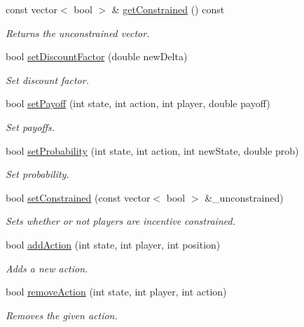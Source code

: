 \begin{DoxyCompactItemize}
const vector$<$ bool $>$ \& \hyperlink{classSGGame_aa32846060a1f8a9b9fc0419a1c1c0510}{get\+Constrained} () const
\begin{DoxyCompactList}\small\item\em Returns the unconstrained vector. \end{DoxyCompactList}\item 
bool \hyperlink{classSGGame_ad5879878c647da7040940469b56b9595}{set\+Discount\+Factor} (double new\+Delta)
\begin{DoxyCompactList}\small\item\em Set discount factor. \end{DoxyCompactList}\item 
bool \hyperlink{classSGGame_a36b2269c87d27ab3e0278ad44b6bbddc}{set\+Payoff} (int state, int action, int player, double payoff)
\begin{DoxyCompactList}\small\item\em Set payoffs. \end{DoxyCompactList}\item 
bool \hyperlink{classSGGame_afcc31eacca8f294d349905d52c9a5f64}{set\+Probability} (int state, int action, int new\+State, double prob)
\begin{DoxyCompactList}\small\item\em Set probability. \end{DoxyCompactList}\item 
\mbox{\label{classSGGame_a5526a6eb4c4fbb9bc6ff3334e411fbf1}} 
bool \hyperlink{classSGGame_a5526a6eb4c4fbb9bc6ff3334e411fbf1}{set\+Constrained} (const vector$<$ bool $>$ \&\+\_\+unconstrained)
\begin{DoxyCompactList}\small\item\em Sets whether or not players are incentive constrained. \end{DoxyCompactList}\item 
bool \hyperlink{classSGGame_a2b3ddf3f5dfca8514cba1933205c5ec3}{add\+Action} (int state, int player, int position)
\begin{DoxyCompactList}\small\item\em Adds a new action. \end{DoxyCompactList}\item 
\mbox{\label{classSGGame_a97999290a05ab0427fd36d0a2a737944}} 
bool \hyperlink{classSGGame_a97999290a05ab0427fd36d0a2a737944}{remove\+Action} (int state, int player, int action)
\begin{DoxyCompactList}\small\item\em Removes the given action. \end{DoxyCompactList}\item 

\end{DoxyCompactItemize}

